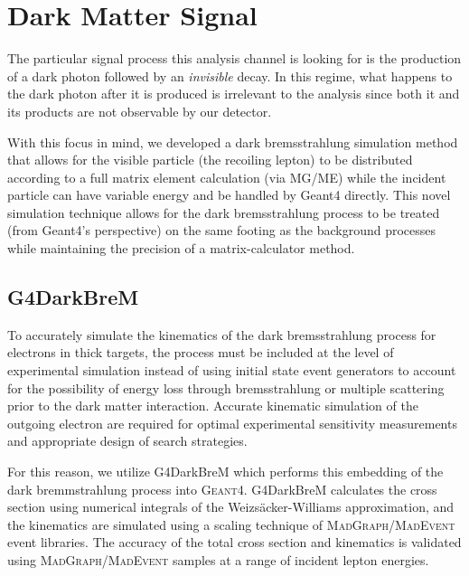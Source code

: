 \section{Dark Matter Signal}
The particular signal process this analysis channel is looking for is the production of a dark
photon followed by an \emph{invisible} decay. In this regime, what happens to the dark photon after
it is produced is irrelevant to the analysis since both it and its products are not observable by
our detector.

With this focus in mind, we developed a dark bremsstrahlung simulation method that allows for the
visible particle (the recoiling lepton) to be distributed according to a full matrix element
calculation (via MG/ME) while the incident particle can have variable energy and be handled by Geant4
directly. This novel simulation technique allows for the dark bremsstrahlung process to be treated
(from Geant4's perspective) on the same footing as the background processes while maintaining the
precision of a matrix-calculator method.

\subsection{G4DarkBreM}
To accurately simulate the kinematics of the dark bremsstrahlung process for electrons in thick
targets, the process must be included at the level of experimental simulation instead of using
initial state event generators to account for the possibility of energy loss through bremsstrahlung
or multiple scattering prior to the dark matter interaction. Accurate kinematic simulation of the
outgoing electron are required for optimal experimental sensitivity measurements and appropriate
design of search strategies.

For this reason, we utilize G4DarkBreM \cite{g4darkbrem} which performs this embedding of the dark
bremmstrahlung process into \textsc{Geant}4. G4DarkBreM calculates the cross section using
numerical integrals of the Weizs\"{a}cker-Williams approximation, and the kinematics are simulated
using a scaling technique of \textsc{MadGraph/MadEvent} event libraries. The accuracy of the total
cross section and kinematics is validated using \textsc{MadGraph/MadEvent} samples at a range of
incident lepton energies.

